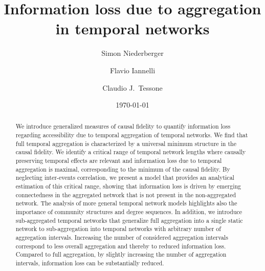 \documentclass[%
 reprint,
 amsmath,amssymb,
 aps,
]{revtex4-2}
\begin{document}

\title{Information loss due to aggregation in temporal networks}%

\author{Simon Niederberger}
%

\author{Flavio Iannelli}
%

\author{Claudio J.~Tessone}
%



\date{\today}%

\begin{abstract}
We introduce generalized measures of causal fidelity to quantify information loss regarding accessibility due to temporal aggregation of temporal networks.
We find that full temporal aggregation 
is characterized by a universal minimum structure in the causal fidelity.  
We identify a critical range of temporal network lengths where causally preserving temporal effects are relevant and information loss due to temporal aggregation is maximal, corresponding to the minimum of the causal fidelity. 
By neglecting inter-events correlation, we present a model that provides an analytical estimation of this critical range, showing that information loss is driven by emerging connectedness in the aggregated network that is not present in the non-aggregated network. 
The analysis of more general temporal network models highlights also the importance of community structures and degree sequences. 
In addition, we introduce sub-aggregated temporal networks that generalize full aggregation into a single static network to sub-aggregation into temporal networks with arbitrary number of aggregation intervals. Increasing the number of considered aggregation intervals correspond to less overall aggregation and thereby to reduced information loss. Compared to full aggregation, by slightly increasing the number of aggregation intervals, information loss can be substantially reduced.
\end{abstract}
\end{document}
